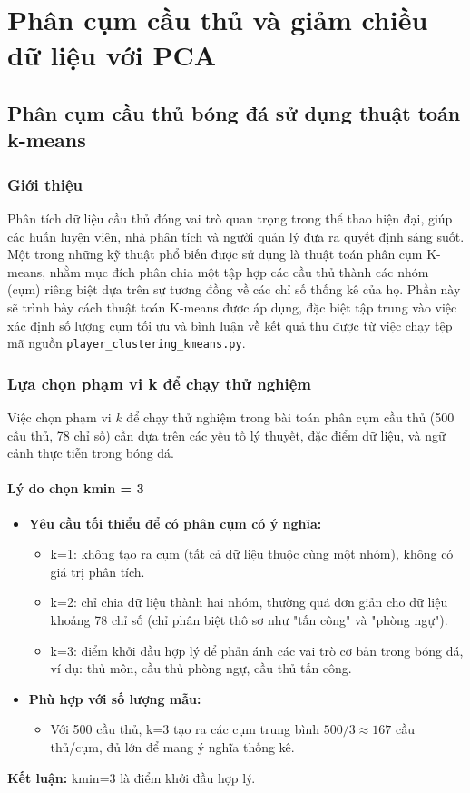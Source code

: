 \documentclass[12pt, a4paper]{report}
\begin{document}
\chapter{Phân cụm cầu thủ và giảm chiều dữ liệu với PCA}

\section{Phân cụm cầu thủ bóng đá sử dụng thuật toán k-means}

\subsection{Giới thiệu} 
Phân tích dữ liệu cầu thủ đóng vai trò quan trọng trong thể thao hiện đại, giúp các huấn luyện viên, nhà phân tích và người quản lý đưa ra quyết định sáng suốt.
Một trong những kỹ thuật phổ biến được sử dụng là thuật toán phân cụm K-means, nhằm mục đích phân chia một tập hợp các cầu thủ thành các nhóm (cụm) riêng biệt dựa trên sự tương đồng về các chỉ số thống kê của họ.
Phần này sẽ trình bày cách thuật toán K-means được áp dụng, đặc biệt tập trung vào việc xác định số lượng cụm tối ưu và bình luận về kết quả thu được từ việc chạy tệp mã nguồn \texttt{player\_clustering\_kmeans.py}.

\subsection{Lựa chọn phạm vi k để chạy thử nghiệm}
Việc chọn phạm vi $k$ để chạy thử nghiệm trong bài toán phân cụm cầu thủ (500 cầu thủ, 78 chỉ số) cần dựa trên các yếu tố lý thuyết, đặc điểm dữ liệu, và ngữ cảnh thực tiễn trong bóng đá.

\subsubsection*{Lý do chọn kmin = 3}
\begin{itemize}
    \item \textbf{Yêu cầu tối thiểu để có phân cụm có ý nghĩa:}
    \begin{itemize}
        \item k=1: không tạo ra cụm (tất cả dữ liệu thuộc cùng một nhóm), không có giá trị phân tích.
        \item k=2: chỉ chia dữ liệu thành hai nhóm, thường quá đơn giản cho dữ liệu khoảng 78 chỉ số (chỉ phân biệt thô sơ như "tấn công" và "phòng ngự").
    
        \item k=3: điểm khởi đầu hợp lý để phản ánh các vai trò cơ bản trong bóng đá, ví dụ: thủ môn, cầu thủ phòng ngự, cầu thủ tấn công.
    \end{itemize}
    \item \textbf{Phù hợp với số lượng mẫu:}
    \begin{itemize}
        \item Với 500 cầu thủ, k=3 tạo ra các cụm trung bình $500/3 \approx 167$ cầu thủ/cụm, đủ lớn để mang ý nghĩa thống kê.
    \end{itemize}
\end{itemize}
\textbf{Kết luận:} kmin=3 là điểm khởi đầu hợp lý.
\end{document}
